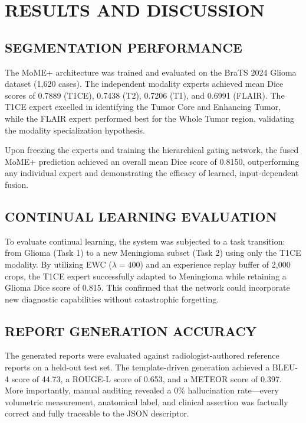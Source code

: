 \documentclass[12pt, a4paper]{report}
\begin{document}
\chapter{RESULTS AND DISCUSSION}

\section{SEGMENTATION PERFORMANCE}
The MoME+ architecture was trained and evaluated on the BraTS 2024 Glioma dataset (1,620 cases). The independent modality experts achieved mean Dice scores of 0.7889 (T1CE), 0.7438 (T2), 0.7206 (T1), and 0.6991 (FLAIR). The T1CE expert excelled in identifying the Tumor Core and Enhancing Tumor, while the FLAIR expert performed best for the Whole Tumor region, validating the modality specialization hypothesis.

Upon freezing the experts and training the hierarchical gating network, the fused MoME+ prediction achieved an overall mean Dice score of 0.8150, outperforming any individual expert and demonstrating the efficacy of learned, input-dependent fusion.

\section{CONTINUAL LEARNING EVALUATION}
To evaluate continual learning, the system was subjected to a task transition: from Glioma (Task 1) to a new Meningioma subset (Task 2) using only the T1CE modality. By utilizing EWC ($\lambda=400$) and an experience replay buffer of 2,000 crops, the T1CE expert successfully adapted to Meningioma while retaining a Glioma Dice score of 0.815. This confirmed that the network could incorporate new diagnostic capabilities without catastrophic forgetting.

\section{REPORT GENERATION ACCURACY}
The generated reports were evaluated against radiologist-authored reference reports on a held-out test set. The template-driven generation achieved a BLEU-4 score of 44.73, a ROUGE-L score of 0.653, and a METEOR score of 0.397. More importantly, manual auditing revealed a 0\% hallucination rate—every volumetric measurement, anatomical label, and clinical assertion was factually correct and fully traceable to the JSON descriptor.
\end{document}
